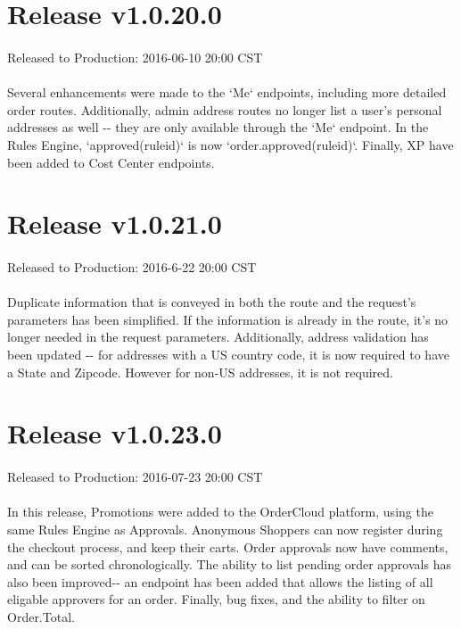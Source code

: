 \documentclass{memoir}%
\begin{document}
%
\section*{Release v1.0.20.0}%
\paragraph*{}%
Released to Production: 2016{-}06{-}10 20:00 CST

%
\paragraph*{}%
Several enhancements were made to the `Me` endpoints, including more detailed order routes. Additionally, admin address routes no longer list a user's personal addresses as well {-}{-} they are only available through the `Me` endpoint. In the Rules Engine, `approved(ruleid)` is now `order.approved(ruleid)`. Finally, XP have been added to Cost Center endpoints.

%
\section*{Release v1.0.21.0}%
\paragraph*{}%
Released to Production: 2016{-}6{-}22 20:00 CST

%
\paragraph*{}%
Duplicate information that is conveyed in both the route and the request's parameters has been simplified. If the information is already in the route, it's no longer needed in the request parameters. Additionally, address validation has been updated {-}{-} for addresses with a US country code, it is now required to have a State and Zipcode. However for non{-}US addresses, it is not required.

%
\section*{Release v1.0.23.0}%
\paragraph*{}%
Released to Production: 2016{-}07{-}23 20:00 CST

%
\paragraph*{}%
In this release, Promotions were added to the OrderCloud platform, using the same Rules Engine as Approvals. Anonymous Shoppers can now register during the checkout process, and keep their carts. Order approvals now have comments, and can be sorted chronologically. The ability to list pending order approvals has also been improved{-}{-} an endpoint has been added that allows the listing of all eligable approvers for an order. Finally, bug fixes, and the ability to filter on Order.Total.
\end{document}
